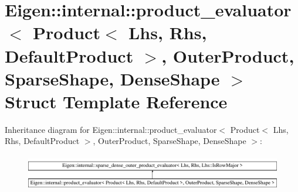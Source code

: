 \hypertarget{struct_eigen_1_1internal_1_1product__evaluator_3_01_product_3_01_lhs_00_01_rhs_00_01_default_pro494452499cb2dffb7b0f87034815802e}{}\section{Eigen\+::internal\+::product\+\_\+evaluator$<$ Product$<$ Lhs, Rhs, Default\+Product $>$, Outer\+Product, Sparse\+Shape, Dense\+Shape $>$ Struct Template Reference}
\label{struct_eigen_1_1internal_1_1product__evaluator_3_01_product_3_01_lhs_00_01_rhs_00_01_default_pro494452499cb2dffb7b0f87034815802e}
Inheritance diagram for Eigen\+::internal\+::product\+\_\+evaluator$<$ Product$<$ Lhs, Rhs, Default\+Product $>$, Outer\+Product, Sparse\+Shape, Dense\+Shape $>$\+:\begin{figure}[H]
\begin{center}
\leavevmode
\includegraphics[height=1.611511cm]{struct_eigen_1_1internal_1_1product__evaluator_3_01_product_3_01_lhs_00_01_rhs_00_01_default_pro494452499cb2dffb7b0f87034815802e}
\end{center}
\end{figure}

